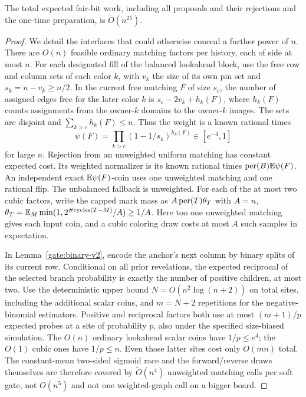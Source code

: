 \begin{proposition}\label{prop:runtime}
The total expected fair-bit work, including all proposals and their
rejections and the one-time preparation, is $\widetilde O(n^{25})$.
\end{proposition}
\begin{proof}
We detail the interfaces that could otherwise conceal a further power
of $n$.  There are $O(n)$ feasible ordinary matching factors per history,
each of side at most $n$. For each designated fill of the balanced
lookahead block, use the free row and column sets of each color $k$,
with $v_k$ the size of its own pin set and $s_k=n-v_k\ge n/2$.
In the current free matching $F$ of size $s_c$, the number of assigned
edges free for the later color $k$ is $s_c-2v_k+h_k(F)$, where $h_k(F)$
counts assignments from the owner-$k$ domains to the owner-$k$ images.
The sets are disjoint and $\sum_{k>c}h_k(F)\le n$. Thus the weight is a
known rational times
\[
 \psi(F)=\prod_{k>c}(1-1/s_k)^{h_k(F)}\in[e^{-4},1]
\]
for large $n$. Rejection from an unweighted uniform matching has constant
expected cost. Its weighted normalizer is its known rational times
$\operatorname{per}(B)\mathbb E\psi(F)$. An independent exact $\mathbb E\psi(F)$-coin uses one
unweighted matching and one rational flip. The unbalanced fallback is
unweighted.  For each of the at most two cubic factors, write the capped
mark mass as $A\operatorname{per}(T)\theta_T$ with $A=n$,
$\theta_T=\mathbb E_M\min(1,2^{\#\text{cycles}(T-M)}/A)\ge1/A$.
Here too one unweighted matching gives each input coin, and a cubic
coloring draw costs at most $A$ such samples in expectation.

In Lemma~\ref{gate:binary-v2}, encode the anchor's next column by binary
splits of its current row. Conditional on all prior revelations, the
expected reciprocal of the selected branch probability is exactly the
number of positive children, at most two.  Use the deterministic upper
bound $N=O(n^2\log(n+2))$ on total sites, including the additional
scalar coins, and $m=N+2$ repetitions for the negative-binomial
estimators. Positive and reciprocal factors both use at most
$(m+1)/p$ expected probes at a site of probability $p$, also under the
specified size-biased simulation. The $O(n)$ ordinary lookahead scalar
coins have $1/p\le e^4$; the $O(1)$ cubic ones have $1/p\le n$.
Even those latter sites cost only $O(mn)$ total. The constant-mean
two-sided sigmoid race and the forward/reverse draws themselves are
therefore covered by $\widetilde O(n^4)$ unweighted matching calls per
soft gate, not $O(n^5)$ and not one weighted-graph call on a bigger board.


\end{proof}
